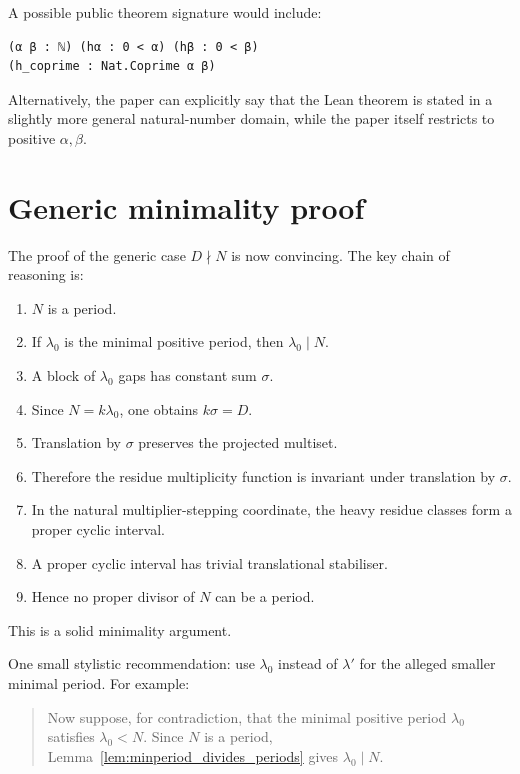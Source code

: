 \documentclass[11pt]{article}
\begin{document}
A possible public theorem signature would include:
\begin{lstlisting}[language=Lean]
(α β : ℕ) (hα : 0 < α) (hβ : 0 < β)
(h_coprime : Nat.Coprime α β)
\end{lstlisting}

Alternatively, the paper can explicitly say that the Lean theorem is stated in
a slightly more general natural-number domain, while the paper itself restricts
to positive \(\alpha,\beta\).

\section{Generic minimality proof}

The proof of the generic case \(D\nmid N\) is now convincing.  The key chain of
reasoning is:

\begin{enumerate}[label=\arabic*.]
    \item \(N\) is a period.
    \item If \(\lambda_0\) is the minimal positive period, then
          \(\lambda_0\mid N\).
    \item A block of \(\lambda_0\) gaps has constant sum \(\sigma\).
    \item Since \(N=k\lambda_0\), one obtains \(k\sigma=D\).
    \item Translation by \(\sigma\) preserves the projected multiset.
    \item Therefore the residue multiplicity function is invariant under
          translation by \(\sigma\).
    \item In the natural multiplier-stepping coordinate, the heavy residue
          classes form a proper cyclic interval.
    \item A proper cyclic interval has trivial translational stabiliser.
    \item Hence no proper divisor of \(N\) can be a period.
\end{enumerate}

This is a solid minimality argument.

One small stylistic recommendation: use \(\lambda_0\) instead of
\(\lambda'\) for the alleged smaller minimal period.  For example:

\begin{quote}
Now suppose, for contradiction, that the minimal positive period
\(\lambda_0\) satisfies \(\lambda_0<N\). Since \(N\) is a period,
Lemma~\ref{lem:minperiod_divides_periods} gives \(\lambda_0\mid N\).
\end{quote}
\end{document}
